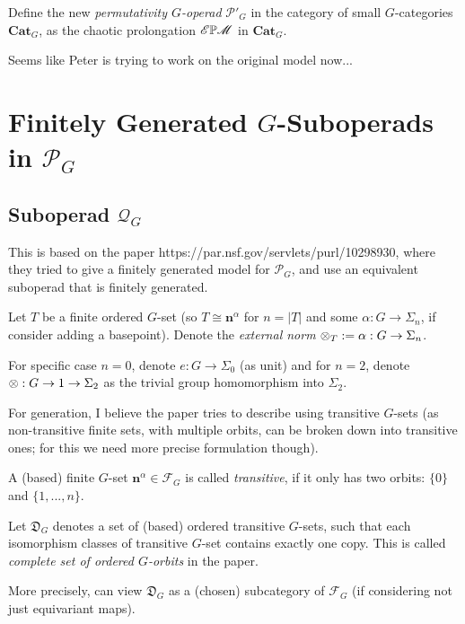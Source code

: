 \documentclass{article}
\begin{document}
\hfil

\begin{defn}
    Define the new \emph{permutativity $G$-operad} $\mathscr{P}'_G$ in the category of small $G$-categories $\mathbf{Cat}_G$, as the chaotic prolongation $\mathscr{E}\mathbb{P}\mathscr{M}$ in $\textbf{Cat}_G$.
\end{defn}

Seems like Peter is trying to work on the original model now...

\newpage

\section{Finitely Generated $G$-Suboperads in $\mathscr{P}_G$}

\subsection{Suboperad $\mathscr{Q}_G$}

This is based on the paper https://par.nsf.gov/servlets/purl/10298930, where they tried to give a finitely generated model for $\mathscr{P}_G$, and use an equivalent suboperad that is finitely generated.

\begin{defn}
    Let $T$ be a finite ordered $G$-set (so $T\cong \mathbf{n}^\alpha$ for $n=|T|$ and some $\alpha:G\rightarrow\Sigma_n$, if consider adding a basepoint). Denote the \emph{external norm} $\otimes_T:=\alpha:G\rightarrow\Sigma_n$.

    For specific case $n=0$, denote $e:G\rightarrow \Sigma_0$ (as unit) and for $n=2$, denote $\otimes:G\rightarrow 1\rightarrow\Sigma_2$ as the trivial group homomorphism into $\Sigma_2$.
\end{defn}

\hfil

For generation, I believe the paper tries to describe using transitive $G$-sets (as non-transitive finite sets, with multiple orbits, can be broken down into transitive ones; for this we need more precise formulation though).

\begin{defn}
    A (based) finite $G$-set $\mathbf{n}^\alpha\in\mathscr{F}_G$ is called \emph{transitive}, if it only has two orbits: $\{0\}$ and $\{1,...,n\}$.
\end{defn}

\begin{defn}
    Let $\mathfrak{D}_G$ denotes a set of (based) ordered transitive $G$-sets, such that each isomorphism classes of transitive $G$-set contains exactly one copy. This is called \emph{complete set of ordered $G$-orbits} in the paper.

    More precisely, can view $\mathfrak{D}_G$ as a (chosen) subcategory of $\mathscr{F}_G$ (if considering not just equivariant maps).
\end{defn}
\end{document}
